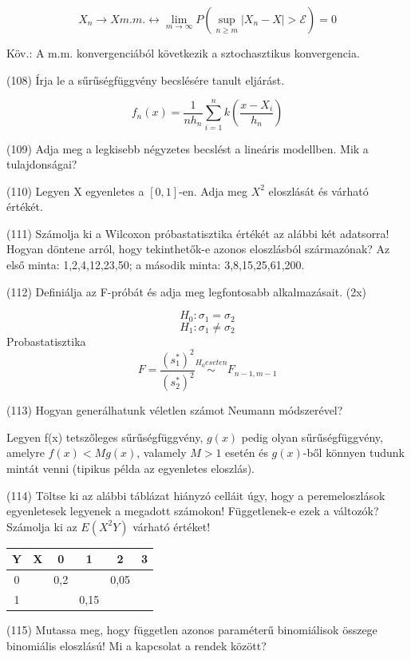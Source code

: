 \documentclass[12p]{article}
\begin{document}
$$X_n \rightarrow X m.m. \leftrightarrow \lim_{m \rightarrow \infty} P(\sup_{n \geq m} |X_n - X| > \mathcal{E}) = 0$$

Köv.: A m.m. konvergenciából következik a
sztochasztikus konvergencia.


(108) Írja le a sűrűségfüggvény becslésére tanult eljárást.

$$f_n(x) = \frac{1}{nh_n}\sum^n_{i=1}k\left( \frac{x-X_i}{h_n} \right)$$

(109) Adja meg a legkisebb négyzetes becslést a lineáris modellben. Mik a tulajdonságai?

(110) Legyen X egyenletes a $[0, 1]$-en. Adja meg $X^2$ eloszlását és várható értékét.

(111) Számolja ki a Wilcoxon próbastatisztika értékét az alábbi két adatsorra! Hogyan döntene arról, hogy tekinthetők-e azonos eloszlásból származónak? Az első minta: 1,2,4,12,23,50;
a második minta: 3,8,15,25,61,200.

(112) Definiálja az F-próbát és adja meg legfontosabb alkalmazásait. (2x)

$$H_0: \sigma_1 = \sigma_2$$
$$H_1: \sigma_1 \neq \sigma_2$$
Probastatisztika
$$F= \frac{(s_1^{*})^2}{(s_2^{*})^2} \stackrel{H_0 eseten}{\sim} F_{n-1,m-1}$$

(113)  Hogyan generálhatunk véletlen számot Neumann módszerével?

Legyen f(x) tetszőleges sűrűségfüggvény, $g(x)$ pedig olyan sűrűségfüggvény, amelyre $f(x) < Mg(x)$, valamely $M>1$ esetén és $g(x)$-ből könnyen tudunk mintát venni (tipikus példa az egyenletes eloszlás).

(114) Töltse ki az alábbi táblázat hiányzó celláit úgy, hogy a peremeloszlások egyenletesek
legyenek a megadott számokon! Függetlenek-e ezek a változók? Számolja ki az $E(X^2Y)$ várható értéket!

\begin{center}
 \begin{tabular}{| c c || c | c | c | c |} 
 \hline
 Y & X &  0 & 1 & 2 & 3\\ [0.5ex] 
 \hline\hline
 0 &  & 0,2 & & 0,05 & \\ 
 \hline
 1 &  & & 0,15 & & \\
 \hline\hline
\end{tabular}
\end{center}

(115) Mutassa meg, hogy független azonos paraméterű binomiálisok összege binomiális eloszlású! Mi a kapcsolat a rendek között?
\end{document}
